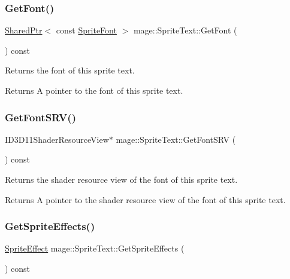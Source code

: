 \subsubsection{\texorpdfstring{Get\+Font()}{GetFont()}}
{\footnotesize\ttfamily \hyperlink{namespacemage_a1e01ae66713838a7a67d30e44c67703e}{Shared\+Ptr}$<$ const \hyperlink{classmage_1_1_sprite_font}{Sprite\+Font} $>$ mage\+::\+Sprite\+Text\+::\+Get\+Font (\begin{DoxyParamCaption}{ }\end{DoxyParamCaption}) const\hspace{0.3cm}{\ttfamily [noexcept]}}

Returns the font of this sprite text.

\begin{DoxyReturn}{Returns}
A pointer to the font of this sprite text. 
\end{DoxyReturn}
\hypertarget{classmage_1_1_sprite_text_a2e09c7c64f9ef7bcc5a28ccfb4f13040}{}\label{classmage_1_1_sprite_text_a2e09c7c64f9ef7bcc5a28ccfb4f13040} 
\subsubsection{\texorpdfstring{Get\+Font\+S\+R\+V()}{GetFontSRV()}}
{\footnotesize\ttfamily I\+D3\+D11\+Shader\+Resource\+View$\ast$ mage\+::\+Sprite\+Text\+::\+Get\+Font\+S\+RV (\begin{DoxyParamCaption}{ }\end{DoxyParamCaption}) const\hspace{0.3cm}{\ttfamily [noexcept]}}

Returns the shader resource view of the font of this sprite text.

\begin{DoxyReturn}{Returns}
A pointer to the shader resource view of the font of this sprite text. 
\end{DoxyReturn}
\hypertarget{classmage_1_1_sprite_text_a2bd9f195c3c31906c2b3dbf276f5bc97}{}\label{classmage_1_1_sprite_text_a2bd9f195c3c31906c2b3dbf276f5bc97} 
\subsubsection{\texorpdfstring{Get\+Sprite\+Effects()}{GetSpriteEffects()}}
{\footnotesize\ttfamily \hyperlink{namespacemage_ad62ebdf0e7aae0caf1535a4ea3f056ea}{Sprite\+Effect} mage\+::\+Sprite\+Text\+::\+Get\+Sprite\+Effects (\begin{DoxyParamCaption}{ }\end{DoxyParamCaption}) const\hspace{0.3cm}{\ttfamily [noexcept]}}

